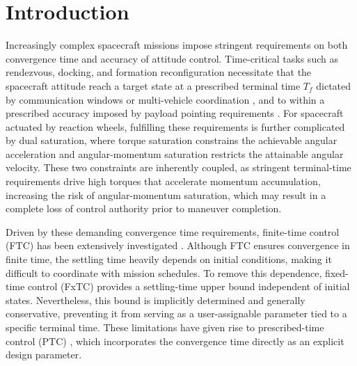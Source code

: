 \documentclass[journal]{new-aiaa}
\begin{document}
\section{Introduction}

Increasingly complex spacecraft missions impose stringent requirements on both convergence time and accuracy of attitude control.
Time-critical tasks such as rendezvous, docking, and formation
reconfiguration necessitate that the spacecraft attitude reach a target state
at a prescribed terminal time $T_f$ dictated by communication windows
or multi-vehicle coordination
\cite{alex_pothen_pose_2022, das_predefined-time_2024, xu_distributed_2024},
and to within a prescribed accuracy imposed by payload pointing requirements
\cite{xiao_attitude_2020,ye_predefined-time_2022,xiao_quantitative_2025}.
For spacecraft actuated by reaction wheels, fulfilling these requirements is further
complicated by dual saturation, where torque saturation constrains the achievable angular acceleration
and angular-momentum saturation restricts the attainable angular velocity.
These two constraints are inherently coupled, as stringent terminal-time requirements
drive high torques that accelerate momentum accumulation,
increasing the risk of angular-momentum saturation, which may
result in a complete loss of control authority prior to maneuver completion. 

Driven by these demanding convergence time requirements, 
finite-time control (FTC) has been extensively investigated 
\cite{hong_finite-time_2006,zhao_adaptive_2018,shi_finite-time_2017,zhou_finite-time_2020}. 
Although FTC ensures convergence in finite time, 
the settling time heavily depends on initial conditions, 
making it difficult to coordinate with mission schedules. 
To remove this dependence, fixed-time control (FxTC) 
\cite{polyakov_nonlinear_2012,polyakov_finite-time_2015,delValleFixtime2025} 
provides a settling-time upper bound independent of initial states. 
Nevertheless, this bound is implicitly determined and generally conservative, 
preventing it from serving as a user-assignable parameter tied to a specific terminal time. 
These limitations have given rise to prescribed-time control (PTC) 
\cite{sanchez-torres_predefined-time_2015,song_time-varying_2017}, 
which incorporates the convergence time directly as an explicit design parameter.
\end{document}
